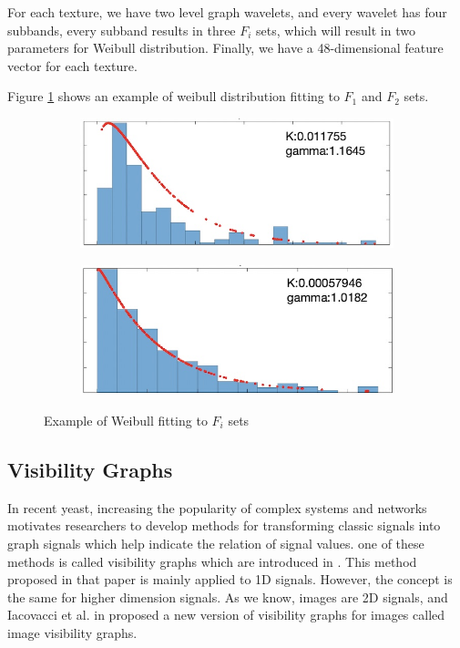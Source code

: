 \documentclass[conference]{IEEEtran}
\begin{document}
For each texture, we have two level graph wavelets, and every wavelet has four subbands, every subband results in three $F_i$ sets, which will result in two parameters for Weibull distribution. Finally, we have a 48-dimensional feature vector for each texture.


Figure \ref{fig:weibull_fit} shows an example of weibull distribution fitting to $F_1$ and $F_2$ sets.
\begin{figure}[tbh]
  \centering
  \begin{subfigure}{0.24\textwidth}
    \centering
    \includegraphics[width=\linewidth]{images/weibull1.jpg}
    \caption{}
  \end{subfigure}
  \hfill
  \begin{subfigure}{0.24\textwidth}
    \centering
    \includegraphics[width=\linewidth]{images/weibull2.jpg}
    \caption{}
  \end{subfigure}
  \caption{Example of Weibull fitting to $F_i$ sets}
  \label{fig:weibull_fit}
\end{figure}



\subsection{\textbf{Visibility Graphs}}
In recent yeast, increasing the popularity of complex systems and networks motivates researchers to develop methods for transforming classic signals into graph signals which help indicate the relation of signal values. one of these methods is called visibility graphs which are introduced in \cite{VG}. This method proposed in that paper is mainly applied to 1D signals. However, the concept is the same for higher dimension signals. As we know, images are 2D signals, and Iacovacci et al. in \cite{IVG} proposed a new version of visibility graphs for images called image visibility graphs.
\end{document}
